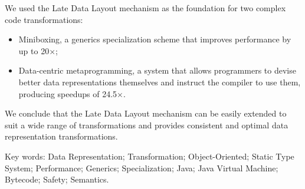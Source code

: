 We used the Late Data Layout mechanism as the foundation for two complex code transformations:

\begin{itemize}
  \item Miniboxing, a generics specialization scheme that improves performance by up to 20$\times$;
  \item Data-centric metaprogramming, a system that allows programmers to devise better data representations themselves and instruct the compiler to use them, producing speedups of 24.5$\times$.
\end{itemize}

We conclude that the Late Data Layout mechanism can be easily extended to suit a wide range of transformations and provides consistent and optimal data representation transformations.

\vskip0.5cm
Key words:
Data Representation; Transformation; Object-Oriented; Static Type System; Performance; Generics; Specialization; Java; Java Virtual Machine; Bytecode; Safety; Semantics.









